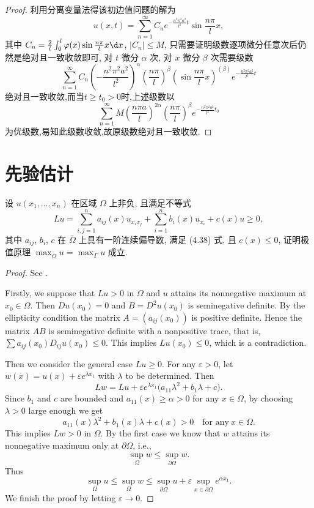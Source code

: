 \begin{proof}
  利用分离变量法得该初边值问题的解为
  \[u(x,t) = \sum_{n=1}^{\infty}C_ne^{-\frac{n^2\pi^2a^2}{l^2}t}\sin\frac{n\pi}{l}x,\]
  其中 $C_n=\frac{2}{l}\int_0^l\varphi(x)\sin\frac{n\pi}{l}x\d x$,
  $|C_n|\leq M$, 只需要证明级数逐项微分任意次后仍然是绝对且一致收敛即可,
  对 $t$ 微分 $\alpha$ 次, 对 $x$ 微分 $\beta$ 次需要级数
  \[\sum_{n=1}^{\infty}C_n\left(-\frac{n^2\pi^2a^2}{l^2}\right)^{\alpha}\left(\frac{n\pi}{l}\right)^{\beta}\left(\sin\frac{n\pi}{l}x\right)^{(\beta)}e^{-\frac{n^2\pi^2a^2}{l^2}t}\]
  绝对且一致收敛,而当$t\geq t_0>0$时,上述级数以
  \[\sum_{n=1}^{\infty}M\left(\frac{n\pi a}{l}\right)^{2\alpha}\left(\frac{n\pi}{l}\right)^{\beta}e^{-\frac{n^2\pi^2a^2}{l^2}t_0}\]
  为优级数,易知此级数收敛,故原级数绝对且一致收敛.
\end{proof}


\section{先验估计}

\begin{exercise}
  设 $u(x_1,\ldots,x_n)$ 在区域 $\Omega$ 上非负, 且满足不等式
  \[Lu = \sum_{i,j=1}^n a_{ij}(x) u_{x_ix_j} + \sum_{i=1}^n b_i(x) u_{x_i} + c(x)u\geq 0,\]
  其中 $a_{ij}$, $b_i$, $c$ 在 $\overline{\Omega}$ 上具有一阶连续偏导数,
  满足 (4.38) 式, 且 $c(x)\leq 0$,
  证明极值原理 $\max_{\overline{\Omega}}u=\max_{\Gamma}u$ 成立.
\end{exercise}

\begin{proof}
  See \cite[Lemma~2.1 \& Theorem~2.3]{han_elliptic_2011}.

  Firstly, we suppose that $Lu >0$ in $\Omega$ and $u$ attains its nonnegative
  maximum at $x_0\in\Omega$. Then $Du(x_0) = 0$ and $B = D^2u(x_0)$
  is seminegative definite. By the ellipticity condition
  the matrix $A = (a_{ij}(x_0))$ is positive definite.
  Hence the matrix $AB$ is seminegative definite with a nonpositive trace,
  that is, $\sum a_{ij}(x_0) D_{ij}u(x_0)\leq 0$. This implies $Lu(x_0)\leq 0$,
  which is a contradiction.

  Then we consider the general case $Lu\geq 0$.
  For any $\varepsilon>0$, let $w(x) = u(x) + \varepsilon e^{\lambda x_1}$ with $\lambda$
  to be determined. Then
  \[ Lw = Lu + \varepsilon e^{\lambda x_1} \bigl(a_{11}\lambda^2
      + b_1\lambda +c\bigr). \]
  Since $b_1$ and $c$ are bounded and $a_{11}(x)\geq\alpha>0$
  for any $x\in\Omega$, by choosing $\lambda>0$ large enough
  we get
  \[ a_{11}(x)\lambda^2 + b_1(x)\lambda + c(x) >0 \quad \text{for any}\ x\in\Omega.\]
  This implies $Lw>0$ in $\Omega$. By the first case we know that
  $w$ attains its nonnegative maximum only at $\partial\Omega$, i.e.,
  \[ \sup_{\Omega} w \leq \sup_{\partial\Omega} w. \]
  Thus
  \[ \sup_{\Omega} u \leq \sup_{\Omega} w
      \leq \sup_{\partial\Omega} u
        + \varepsilon \sup_{x\in\partial\Omega} e^{\alpha x_1}. \]
  We finish the proof by letting $\varepsilon\to 0$.
\end{proof}


